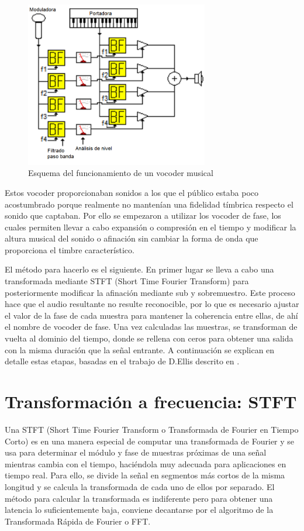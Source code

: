 \begin{figure}
\begin{center}
\includegraphics[width=8cm]{img/music_vocoder.png}
\caption{Esquema del funcionamiento de un vocoder musical}
\end{center}
\end{figure}

Estos vocoder proporcionaban sonidos a los que el público estaba poco acostumbrado porque realmente no mantenían una fidelidad tímbrica respecto el sonido que captaban. Por ello se empezaron a utilizar los vocoder de fase, los cuales permiten llevar a cabo expansión o compresión en el tiempo y  modificar la altura musical del sonido o afinación sin cambiar la forma de onda que proporciona el timbre característico.

El método para hacerlo es el siguiente. En primer lugar se lleva a cabo una transformada mediante STFT (Short Time Fourier Transform) para posteriormente modificar la afinación mediante sub y sobremuestro. Este proceso hace que el audio resultante no resulte reconocible, por lo que es necesario ajustar el valor de la fase de cada muestra para mantener la coherencia entre ellas, de ahí el nombre de vocoder de fase. Una vez calculadas las muestras, se transforman de vuelta al dominio del tiempo, donde se rellena con ceros para obtener una salida con la misma duración que la señal entrante. A continuación se explican en detalle estas etapas, basadas en el trabajo de D.Ellis descrito en \cite{Ellis}.

\section{Transformación a frecuencia: STFT}

Una STFT (Short Time Fourier Transform o Transformada de Fourier en Tiempo Corto) es en una manera especial de computar una transformada de Fourier y se usa para determinar el módulo y fase de muestras próximas de una señal mientras cambia con el tiempo, haciéndola muy adecuada para aplicaciones en tiempo real. Para ello, se divide la señal en segmentos más cortos de la misma longitud y se calcula la transformada de cada uno de ellos por separado. El método para calcular la transformada es indiferente pero para obtener una latencia lo suficientemente baja, conviene decantarse por el algoritmo de la Transformada Rápida de Fourier o FFT.

